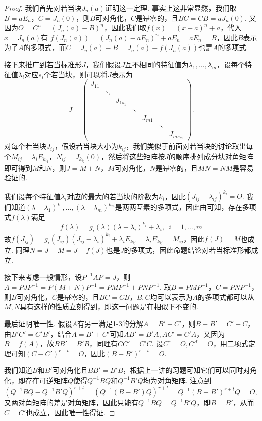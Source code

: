 \begin{proof}
    我们首先对若当块$J_n(a)$证明这一定理. 事实上这非常显然，我们取$B=aE_n$，$C=J_n(0)$，则$B$可对角化，$C$是幂零的，且$BC=CB=aJ_n(0)$. 又因为$O=C^n=(J_n(a)-B)^n$，因此我们取$f(x)=(x-a)^n+a$，代入$x=J_n(a)$有
    $f(J_n(a))=(J_n(a)-aE_n)^n+aE_n=aE_n=B$，因此$B$表示为了$A$的多项式，而$C=J_n(a)-B=J_n(a)-f(J_n(a))$也是$A$的多项式.

    接下来推广到若当标准形$J$，我们假设$J$互不相同的特征值为$\lambda_1,\ldots,\lambda_m$，设每个特征值$\lambda_i$对应$s_i$个若当块，则可以将$J$表示为
    \[J=\begin{pmatrix}
            J_{11} &        &          &        &        &        &          \\
                   & \ddots &          &        &        &        &          \\
                   &        & J_{1s_1} &        &        &        &          \\
                   &        &          & \ddots &        &        &          \\
                   &        &          &        & J_{m1} &        &          \\
                   &        &          &        &        & \ddots &          \\
                   &        &          &        &        &        & J_{ms_m}
        \end{pmatrix}.\]
    对每个若当块$J_{ij}$，假设若当块大小为$k_{ij}$，我们类似于前面对若当块的讨论取出每个$M_{ij}=\lambda_i E_{k_{ij}}$，$N_{ij}=J_{k_{ij}}(0)$，然后将这些矩阵按$J$的顺序排列成分块对角矩阵即可得到$M$和$N$，则$J=M+N$，$M$可对角化，$N$是幂零的，且$MN=NM$是容易验证的.

    我们设每个特征值$\lambda_i$对应的最大的若当块的阶数为$k_i$，因此$(J_{ij}-\lambda_{ij})^{k_i}=O$. 我们知道$(\lambda-\lambda_1)^{k_1},\ldots,(\lambda-\lambda_m)^{k_m}$是两两互素的多项式，因此由可知，存在多项式$f(\lambda)$满足
    \[f(\lambda)=g_i(\lambda)(\lambda-\lambda_i)^{k_i}+\lambda_i,\enspace i=1,\ldots,m\]
    故$f(J_{ij})=g_i(J_{ij})(J_{ij}-\lambda_i)^{k_i}+\lambda_iE_{k_{ij}}=\lambda_iE_{k_{ij}}=M_{ij}$，因此$f(J)=M$也成立. 同理$N=J-M=J-f(J)$也是$J$的多项式，因此命题结论对若当标准形都成立.

    接下来考虑一般情形，设$P^{-1}AP=J$，则$A=PJP^{-1}=P(M+N)P^{-1}=PMP^{-1}+PNP^{-1}$. 取$B=PMP^{-1}$，$C=PNP^{-1}$，则$B$可对角化，$C$是幂零的，且$BC=CB$，$B,C$均可以表示为$A$的多项式都可以从$M,N$具有这样的性质立刻得到，即这一问题是在相似下不变的.

    最后证明唯一性. 假设$A$有另一满足1-3的分解$A=B'+C'$，则$B-B'=C'-C$，由$B'C'=C'B'$，结合$A=B'+C'$可知$AB'=B'A,AC'=C'A$，又因为$B=f(A)$，故$BB'=B'B$，同理有$CC'=C'C$. 设$C^r=O,C'^t=O$，用二项式定理可知$(C-C')^{r+t}=O$，因此$(B-B')^{r+t}=O$.

    我们知道$B$和$B'$可对角化且$BB'=B'B$，根据上一讲的习题可知它们可以同时对角化，即存在可逆矩阵$Q$使得$Q^{-1}BQ$和$Q^{-1}B'Q$均为对角矩阵. 注意到
    \[(Q^{-1}BQ-Q^{-1}B'Q)^{r+t}=(Q^{-1}(B-B')Q)^{r+t}=Q^{-1}(B-B')^{r+t}Q=O,\]
    又两对角矩阵的差是对角矩阵，因此只能有$Q^{-1}BQ=Q^{-1}B'Q$，即$B=B'$，从而$C=C'$也成立，因此唯一性得证.
\end{proof}

